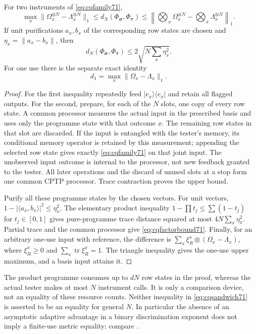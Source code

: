 \begin{lemma}\label{lem:cqmetric71}
For two instruments of \eqref{eq:cqfamily71},
\begin{equation}\label{eq:cqsandwich71}
 \max_x\|\Omega_x^{\otimes N}-\Lambda_x^{\otimes N}\|_1
 \le d_N(\Phi_{\boldsymbol\sigma},\Phi_{\boldsymbol\tau})
 \le\left\|\bigotimes_x\Omega_x^{\otimes N}
               -\bigotimes_x\Lambda_x^{\otimes N}\right\|_1.
\end{equation}
If unit purifications $a_x,b_x$ of the corresponding row states are
chosen and $\eta_x=\|a_x-b_x\|$, then
\begin{equation}\label{eq:cqfactorbound71}
 d_N(\Phi_{\boldsymbol\sigma},\Phi_{\boldsymbol\tau})
                  \le2\sqrt{N\sum_x\eta_x^2}.
\end{equation}
For one use there is the separate exact identity
\begin{equation}\label{eq:cqoneuse72}
 d_1=\max_x\|\Omega_x-\Lambda_x\|_1.
\end{equation}
\end{lemma}
\begin{proof}
For the first inequality repeatedly feed $|e_x\rangle\langle e_x|$
and retain all flagged outputs. For the second, prepare, for each
of the $N$ slots, one copy of every row state. A common processor
measures the actual input in the prescribed basis and uses only the
programme state with that outcome $x$. The remaining row states in
that slot are discarded. If the input is entangled with the tester's
memory, its conditional memory operator is retained by this measurement;
appending the selected row state gives exactly
\eqref{eq:cqfamily71} on that joint input. The unobserved input outcome
is internal to the processor, not new feedback granted to the tester.
All later operations and the discard of unused slots at a stop form one
common CPTP processor. Trace contraction proves the upper bound.

Purify all these programme states by the chosen vectors. For unit
vectors, $1-|\langle a_x,b_x\rangle|^2\le\eta_x^2$. The elementary
product inequality $1-\prod t_j\le\sum(1-t_j)$ for $t_j\in[0,1]$
gives pure-programme trace distance squared at most
$4N\sum_x\eta_x^2$. Partial trace and the common processor give
\eqref{eq:cqfactorbound71}. Finally, for an arbitrary one-use input
with reference, the difference is
$\sum_x\xi_R^x\otimes(\Omega_x-\Lambda_x)$, where
$\xi_R^x\ge0$ and $\sum_x\operatorname{tr}\xi_R^x=1$.
The triangle inequality gives the one-use upper maximum, and a basis
input attains it.
\end{proof}
The product programme consumes up to $dN$ row states in the proof,
whereas the actual tester makes at most $N$ instrument calls. It is
only a comparison device, not an equality of these resource counts.
Neither inequality in \eqref{eq:cqsandwich71} is asserted to be an
equality for general $N$. In particular the absence of an asymptotic
adaptive advantage in a binary discrimination exponent does not imply
a finite-use metric equality; compare \cite[Sections~II and V]{SHW68}.

